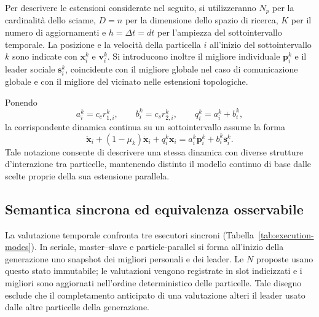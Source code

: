 Per descrivere le estensioni considerate nel seguito, si utilizzeranno $N_p$ per la cardinalit\`a dello sciame, $D=n$ per la dimensione dello spazio di ricerca, $K$ per il numero di aggiornamenti e $h=\Delta t=dt$ per l'ampiezza del sottointervallo temporale. La posizione e la velocit\`a della particella $i$ all'inizio del sottointervallo $k$ sono indicate con $\bm x_i^k$ e $\bm v_i^k$. Si introducono inoltre il migliore individuale $\bm p_i^k$ e il leader sociale $\bm s_i^k$, coincidente con il migliore globale nel caso di comunicazione globale e con il migliore del vicinato nelle estensioni topologiche.

Ponendo
\begin{equation}
 a_i^k=c_c r_{1,i}^k,\qquad
 b_i^k=c_s r_{2,i}^k,\qquad
 q_i^k=a_i^k+b_i^k,
 \label{eq:cpso-weights}
\end{equation}
la corrispondente dinamica continua su un sottointervallo assume la forma
\begin{equation}
 \ddot{\bm x}_i+(1-\mu_k)\dot{\bm x}_i
 +q_i^k\bm x_i=a_i^k\bm p_i^k+b_i^k\bm s_i^k.
 \label{eq:cpso-model}
\end{equation}
Tale notazione consente di descrivere una stessa dinamica con diverse strutture d'interazione tra particelle, mantenendo distinto il modello continuo di base dalle scelte proprie della sua estensione parallela.

\subsection{Semantica sincrona ed equivalenza osservabile}
La valutazione temporale confronta tre esecutori sincroni (Tabella~\ref{tab:execution-modes}). In seriale, master--slave e particle-parallel si forma all'inizio della generazione uno snapshot dei migliori personali e dei leader. Le $N$ proposte usano questo stato immutabile; le valutazioni vengono registrate in slot indicizzati e i migliori sono aggiornati nell'ordine deterministico delle particelle. Tale disegno esclude che il completamento anticipato di una valutazione alteri il leader usato dalle altre particelle della generazione.

